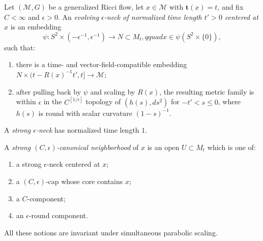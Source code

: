 \begin{definition}\label{def:strong-epsilon-neck-canonical-neighborhood}
\label{defncanonnbhd}

Let $(\mathcal M,G)$ be a generalized Ricci flow, let
$x\in\mathcal M$ with $\mathbf t(x)=t$, and fix $C<\infty$ and
$\epsilon>0$. An \emph{evolving $\epsilon$-neck of normalized time
length $t'>0$ centered at $x$} is an embedding
\[
 \psi:S^2\times(-\epsilon^{-1},\epsilon^{-1})\longrightarrow
 N\subset M_t,qquad x\in\psi(S^2\times\{0\}),
\]
such that:
\begin{enumerate}
\item[(1)] there is a time- and vector-field-compatible embedding
$N\times(t-R(x)^{-1}t',t]\to\mathcal M$;
\item[(2)] after pulling back by $\psi$ and scaling by $R(x)$, the
resulting metric family is within $\epsilon$ in the
$C^{[1/\epsilon]}$ topology of
$(h(s),ds^2)$ for $-t'<s\leq0$, where $h(s)$ is round with scalar
curvature $(1-s)^{-1}$.
\end{enumerate}
A \emph{strong $\epsilon$-neck} has normalized time length $1$.

A \emph{strong $(C,\epsilon)$-canonical neighborhood} of $x$ is an
open $U\subset M_t$ which is one of:
\begin{enumerate}
\item[(1)] a strong $\epsilon$-neck centered at $x$;
\item[(2)] a $(C,\epsilon)$-cap whose core contains $x$;
\item[(3)] a $C$-component;
\item[(4)] an $\epsilon$-round component.
\end{enumerate}
All these notions are invariant under simultaneous parabolic
scaling.
\end{definition}

